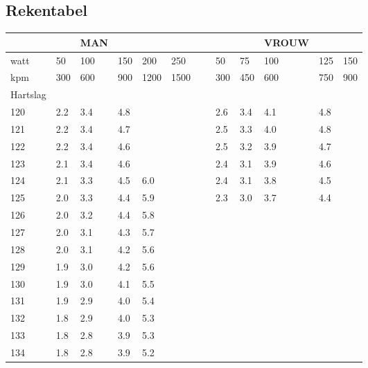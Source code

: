 \documentclass[]{article}
\begin{document}
\subsection{Rekentabel}
\begin{table}
    \begin{tabular}{l|lllllllllll}
    ~        & ~   & MAN & ~   & ~    & ~    & ~ & ~   & ~   & VROUW & ~   & ~   \\ \hline
    watt     & 50  & 100 & 150 & 200  & 250  & ~ & 50  & 75  & 100   & 125 & 150 \\
    kpm      & 300 & 600 & 900 & 1200 & 1500 & ~ & 300 & 450 & 600   & 750 & 900 \\ \hline
    Hartslag & ~   & ~   & ~   & ~    & ~    & ~ & ~   & ~   & ~     & ~   & ~   \\
    120      & 2.2 & 3.4 & 4.8 & ~    & ~    & ~ & 2.6 & 3.4 & 4.1   & 4.8 & ~   \\
    121      & 2.2 & 3.4 & 4.7 & ~    & ~    & ~ & 2.5 & 3.3 & 4.0   & 4.8 & ~   \\
    122      & 2.2 & 3.4 & 4.6 & ~    & ~    & ~ & 2.5 & 3.2 & 3.9   & 4.7 & ~   \\
    123      & 2.1 & 3.4 & 4.6 & ~    & ~    & ~ & 2.4 & 3.1 & 3.9   & 4.6 & ~   \\
    124      & 2.1 & 3.3 & 4.5 & 6.0  & ~    & ~ & 2.4 & 3.1 & 3.8   & 4.5 & ~   \\
    125      & 2.0 & 3.3 & 4.4 & 5.9  & ~    & ~ & 2.3 & 3.0 & 3.7   & 4.4 & ~   \\
    126      & 2.0 & 3.2 & 4.4 & 5.8  & ~    & ~ & ~   & ~   & ~     & ~   & ~   \\
    127      & 2.0 & 3.1 & 4.3 & 5.7  & ~    & ~ & ~   & ~   & ~     & ~   & ~   \\
    128      & 2.0 & 3.1 & 4.2 & 5.6  & ~    & ~ & ~   & ~   & ~     & ~   & ~   \\
    129      & 1.9 & 3.0 & 4.2 & 5.6  & ~    & ~ & ~   & ~   & ~     & ~   & ~   \\
    130      & 1.9 & 3.0 & 4.1 & 5.5  & ~    & ~ & ~   & ~   & ~     & ~   & ~   \\
    131      & 1.9 & 2.9 & 4.0 & 5.4  & ~    & ~ & ~   & ~   & ~     & ~   & ~   \\
    132      & 1.8 & 2.9 & 4.0 & 5.3  & ~    & ~ & ~   & ~   & ~     & ~   & ~   \\
    133      & 1.8 & 2.8 & 3.9 & 5.3  & ~    & ~ & ~   & ~   & ~     & ~   & ~   \\
    134      & 1.8 & 2.8 & 3.9 & 5.2  & ~    & ~ & ~   & ~   & ~     & ~   & ~   \\

\end{tabular}
\end{table}
\end{document}
